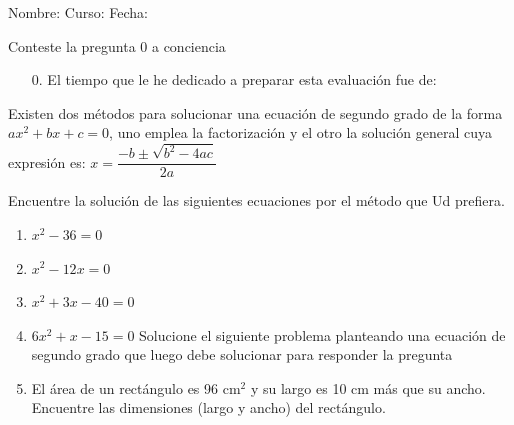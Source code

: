 \documentclass[letterpaper,fleqn]{article}
\newcommand{\LineaNombre}{%
\par
\vspace{\baselineskip}
Nombre:\hrulefill \; Curso: \underline{\hspace*{48pt}} \; Fecha: \underline{\hspace*{2.5cm}} \relax
\par}
\begin{document}
\LineaNombre
\vspace*{12pt}
Conteste la pregunta 0 a conciencia
\begin{enumerate}
 \item[0.] El tiempo que le he dedicado a preparar esta evaluación fue de:
\end{enumerate}
\vspace*{10pt} 
Existen dos métodos para solucionar una ecuación de segundo grado de la forma $ax^{2}+bx+c=0$, uno emplea la factorización y el otro la solución general cuya expresión es: 
$x=\dfrac{-b\pm \sqrt{b^{2}-4ac}}{2a}$

 Encuentre la solución de las siguientes ecuaciones por el método que Ud prefiera.
 \begin{enumerate}
 \item $x^{2}-36=0$ \noanswer
 \item $x^{2}-12x=0$ \noanswer
 \item $x^{2}+3x-40=0$ \noanswer
 \item $6x^{2}+x-15=0$\noanswer
 Solucione el siguiente problema planteando una ecuación de segundo grado que luego debe solucionar para responder la pregunta
 \item El área de un rectángulo es 96 cm$^{2}$ y su largo es 10 cm más que su ancho. Encuentre las dimensiones (largo y ancho) del rectángulo. \noanswer
 \end{enumerate}
\end{document}
